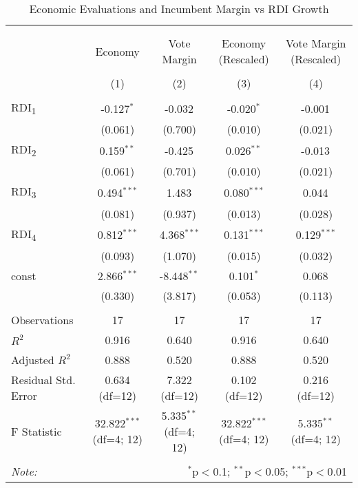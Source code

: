 \begin{table}[!htbp]
\centering
\caption{Economic Evaluations and Incumbent Margin vs RDI Growth}
\begin{tabular}{@{\extracolsep{2pt}}lcccc}
\\[-1.8ex]\hline
\hline \\[-1.8ex]
\\[-1.8ex] & \multicolumn{1}{c}{Economy} & \multicolumn{1}{c}{Vote Margin} & \multicolumn{1}{c}{Economy (Rescaled)} & \multicolumn{1}{c}{Vote Margin (Rescaled)}  \\
\\[-1.8ex] & (1) & (2) & (3) & (4) \\
\hline \\[-1.8ex]
 RDI\textsubscript{1} & -0.127$^{*}$ & -0.032$^{}$ & -0.020$^{*}$ & -0.001$^{}$ \\
& (0.061) & (0.700) & (0.010) & (0.021) \\
 RDI\textsubscript{2} & 0.159$^{**}$ & -0.425$^{}$ & 0.026$^{**}$ & -0.013$^{}$ \\
& (0.061) & (0.701) & (0.010) & (0.021) \\
 RDI\textsubscript{3} & 0.494$^{***}$ & 1.483$^{}$ & 0.080$^{***}$ & 0.044$^{}$ \\
& (0.081) & (0.937) & (0.013) & (0.028) \\
 RDI\textsubscript{4} & 0.812$^{***}$ & 4.368$^{***}$ & 0.131$^{***}$ & 0.129$^{***}$ \\
& (0.093) & (1.070) & (0.015) & (0.032) \\
 const & 2.866$^{***}$ & -8.448$^{**}$ & 0.101$^{*}$ & 0.068$^{}$ \\
& (0.330) & (3.817) & (0.053) & (0.113) \\
\hline \\[-1.8ex]
 Observations & 17 & 17 & 17 & 17 \\
 $R^2$ & 0.916 & 0.640 & 0.916 & 0.640 \\
 Adjusted $R^2$ & 0.888 & 0.520 & 0.888 & 0.520 \\
 Residual Std. Error & 0.634 (df=12) & 7.322 (df=12) & 0.102 (df=12) & 0.216 (df=12) \\
 F Statistic & 32.822$^{***}$ (df=4; 12) & 5.335$^{**}$ (df=4; 12) & 32.822$^{***}$ (df=4; 12) & 5.335$^{**}$ (df=4; 12) \\
\hline
\hline \\[-1.8ex]
\textit{Note:} & \multicolumn{4}{r}{$^{*}$p$<$0.1; $^{**}$p$<$0.05; $^{***}$p$<$0.01} \\
\end{tabular}
\end{table}